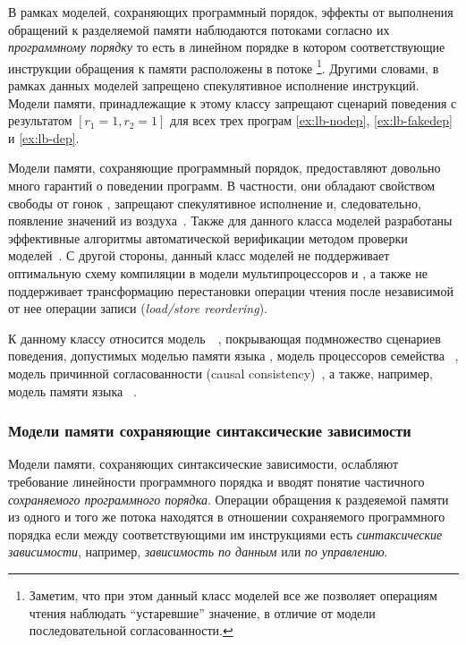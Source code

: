 В рамках моделей, сохраняющих программный порядок, 
эффекты от выполнения обращений к разделяемой памяти
наблюдаются потоками согласно их \emph{программному порядку}
то есть в линейном порядке в котором соответствующие 
инструкции обращения к памяти расположены в потоке%
\footnote{Заметим, что при этом данный класс моделей 
все же позволяет операциям чтения наблюдать ``устаревшие'' значение, 
в отличие от модели последовательной согласованности.}. 
Другими словами, в рамках данных моделей запрещено 
спекулятивное исполнение инструкций. 
Модели памяти, принадлежащие к этому классу 
запрещают сценарий поведения с результатом ${[r_1=1,r_2=1]}$
для всех трех програм \ref{ex:lb-nodep}, \ref{ex:lb-fakedep} и \ref{ex:lb-dep}.

Модели памяти, сохраняющие программный порядок, 
предоставляют довольно много гарантий о поведении программ. 
В частности, они обладают свойством свободы от гонок \DRF, 
запрещают спекулятивное исполнение и, следовательно, 
появление значений из воздуха~\cite{Lahav-al:PLDI17}. 
Также для данного класса моделей разработаны эффективные 
алгоритмы автоматической верификации 
методом проверки моделей~\cite{Kokologiannakis-al:POPL2017, Kokologiannakis:PLDI2019}.
С другой стороны, данный класс моделей не поддерживает
оптимальную схему компиляции в модели мультипроцессоров
\ARM и \POWER, а также не поддерживает трансформацию 
перестановки операции чтения после независимой
от нее операции записи (\emph{load/store reordering}). 

К данному классу относится модель~\RCMM~\cite{Lahav-al:PLDI17}, 
покрывающая подмножество сценариев поведения, допустимых моделью памяти языка \CLANG,
модель \TSO процессоров семейства \Intel~\cite{Sewell-al:CACM10},
модель причинной согласованности (causal consistency)~\cite{Lahav-Boker:PLDI2020},
а также, например, модель памяти языка \OCaml~\cite{Dolan-al:PLDI18}.

\subsubsection*{Модели памяти сохраняющие синтаксические зависимости}

Модели памяти, сохраняющих синтаксические зависимости, 
ослабляют требование линейности программного порядка 
и вводят понятие частичного \emph{сохраняемого программного порядка}. 
Операции обращения к раздеяемой памяти из одного и того же потока
находятся в отношении сохраняемого программного порядка 
если между соответствующими им инструкциями есть 
\emph{синтаксические зависимости}, например, 
\emph{зависимость по данным} или \emph{по управлению}. 

